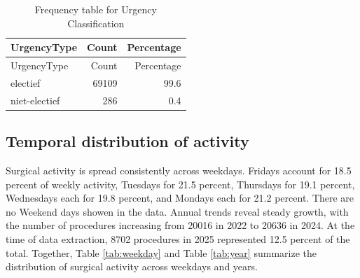 \documentclass[
]{article}
\begin{document}
\begin{longtable}[]{@{}lrr@{}}
\caption{Frequency table for Urgency Classification
\label{tab:urgencytype}}\tabularnewline
\toprule\noalign{}
UrgencyType & Count & Percentage \\
\midrule\noalign{}
\endfirsthead
\toprule\noalign{}
UrgencyType & Count & Percentage \\
\midrule\noalign{}
\endhead
\bottomrule\noalign{}
\endlastfoot
electief & 69109 & 99.6 \\
niet-electief & 286 & 0.4 \\
\end{longtable}

\subsection{Temporal distribution of
activity}\label{temporal-distribution-of-activity}

Surgical activity is spread consistently across weekdays. Fridays
account for 18.5 percent of weekly activity, Tuesdays for 21.5 percent,
Thursdays for 19.1 percent, Wednesdays each for 19.8 percent, and
Mondays each for 21.2 percent. There are no Weekend days showen in the
data. Annual trends reveal steady growth, with the number of procedures
increasing from 20016 in 2022 to 20636 in 2024. At the time of data
extraction, 8702 procedures in 2025 represented 12.5 percent of the
total. Together, Table \ref{tab:weekday} and Table \ref{tab:year}
summarize the distribution of surgical activity across weekdays and
years.
\end{document}
